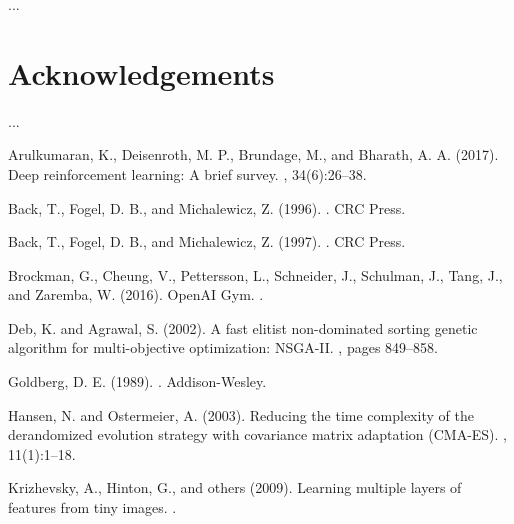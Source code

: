\documentclass{article}
\begin{document}
...

\section*{Acknowledgements}

...




\begin{thebibliography}{10}

Arulkumaran, K., Deisenroth, M. P., Brundage, M., and Bharath, A. A. (2017).
\newblock Deep reinforcement learning: A brief survey.
, 34(6):26--38.

Back, T., Fogel, D. B., and Michalewicz, Z. (1996).
.
\newblock CRC Press.

Back, T., Fogel, D. B., and Michalewicz, Z. (1997).
.
\newblock CRC Press.

Brockman, G., Cheung, V., Pettersson, L., Schneider, J., Schulman, J., Tang, J., and Zaremba, W. (2016).
\newblock OpenAI Gym.
.

Deb, K. and Agrawal, S. (2002).
\newblock A fast elitist non-dominated sorting genetic algorithm for multi-objective optimization: NSGA-II.
, pages 849--858.

Goldberg, D. E. (1989).
.
\newblock Addison-Wesley.

Hansen, N. and Ostermeier, A. (2003).
\newblock Reducing the time complexity of the derandomized evolution strategy with covariance matrix adaptation (CMA-ES).
, 11(1):1--18.

Krizhevsky, A., Hinton, G., and others (2009).
\newblock Learning multiple layers of features from tiny images.
.


\end{thebibliography}
\end{document}

